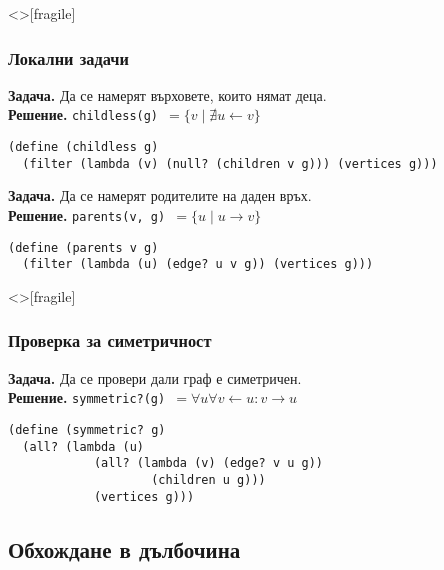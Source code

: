 \documentclass[alsotrans,beameroptions={aspectratio=169}]{beamerswitch}
\begin{document}
\begin{frame}<>[fragile]
  \frametitle{Локални задачи}

  \small
  \textbf{Задача. }Да се намерят върховете, които нямат деца.\\
  \pause
  \textbf{Решение. }\tt{childless(g)} $ = \{v\;|\;\nexists u \leftarrow v \}$
  \pause
\begin{lstlisting}
(define (childless g)
  (filter (lambda (v) (null? (children v g))) (vertices g)))
\end{lstlisting}
  \pause
  \vspace{2ex}
  \textbf{Задача. }Да се намерят родителите на даден връх.\\
  \pause
  \textbf{Решение. }\tt{parents(v, g)} $ = \{u\;|\;u \rightarrow v \}$
  \pause
\begin{lstlisting}
(define (parents v g)
  (filter (lambda (u) (edge? u v g)) (vertices g)))
\end{lstlisting}
\end{frame}

\begin{frame}<>[fragile]
  \frametitle{Проверка за симетричност}
  \textbf{Задача. }Да се провери дали граф е симетричен.\\
  \pause
  \textbf{Решение. }\tt{symmetric?(g)} $ = \forall u\forall v\leftarrow u: v\rightarrow u$
  \pause
\begin{lstlisting}
(define (symmetric? g)
  (all? (lambda (u)
            (all? (lambda (v) (edge? v u g))
                    (children u g)))
            (vertices g)))
\end{lstlisting}
\end{frame}

\subsection{Обхождане в дълбочина}
\end{document}

